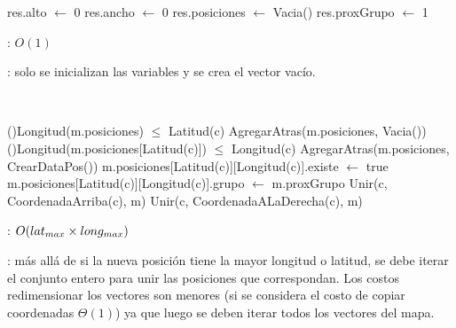\begin{Algoritmos}

	\begin{algorithm}[H]
		\NoCaptionOfAlgo
		\caption{}
		res.alto $\leftarrow$ 0
		res.ancho $\leftarrow$ 0
		res.posiciones $\leftarrow$ Vacia()
		res.proxGrupo $\leftarrow$ 1
	\end{algorithm}

	\complejidad: $O(1)$

	\justifcomp: solo se inicializan las variables y se crea el vector vacío.

	~

	\begin{algorithm}[H]
		\NoCaptionOfAlgo
		\caption{}
		\While(){Longitud(m.posiciones) $\leq$ Latitud(c)}{
			AgregarAtras(m.posiciones, Vacia())
		}
		\While(){Longitud(m.posiciones[Latitud(c)]) $\leq$ Longitud(c)}{
			AgregarAtras(m.posiciones, CrearDataPos())
		}
		m.posiciones[Latitud(c)][Longitud(c)].existe $\leftarrow$ true
		m.posiciones[Latitud(c)][Longitud(c)].grupo $\leftarrow$ m.proxGrupo
		Unir(c, CoordenadaArriba(c), m)\OdeLinea{\compmatriz}
		Unir(c, CoordenadaALaDerecha(c), m)\OdeLinea{\compmatriz}
	\end{algorithm}

	\complejidad: $O(lat_{max} \times long_{max})$

	\justifcomp: más allá de si la nueva posición tiene la mayor longitud o latitud, se debe iterar el conjunto entero para unir las posiciones que correspondan. Los costos redimensionar los vectores son menores (si se considera el costo de copiar coordenadas $\Theta(1)$) ya que luego se deben iterar todos los vectores del mapa.


\end{Algoritmos}

